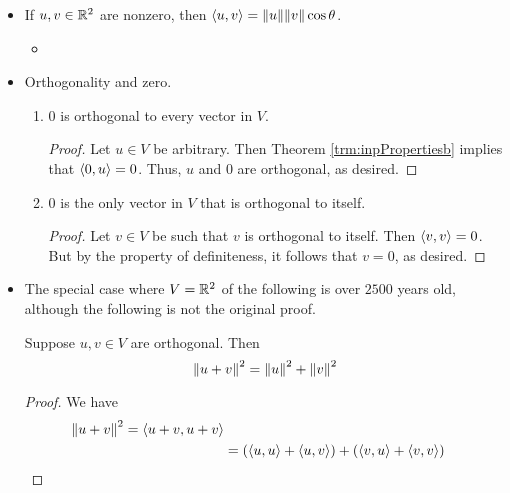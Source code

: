 \documentclass[../main.tex]{subfiles}
\begin{document}
\begin{itemize}
    \item If $u,v\in\mathbb{R}^2$ are nonzero, then $\langle{u},{v}\rangle=\norm{u}\norm{v}\cos\theta$.
    \begin{itemize}
        \item {}
    \end{itemize}
    \item Orthogonality and zero.
    \begin{theorem}\leavevmode
        \begin{enumerate}[label={\textup{(}\alph*\textup{)}}]
            \item $0$ is orthogonal to every vector in $V$.
            \begin{proof}
                Let $u\in V$ be arbitrary. Then Theorem \ref{trm:inpPropertiesb} implies that $\langle{0},{u}\rangle=0$. Thus, $u$ and 0 are orthogonal, as desired.
            \end{proof}
            \item $0$ is the only vector in $V$ that is orthogonal to itself.
            \begin{proof}
                Let $v\in V$ be such that $v$ is orthogonal to itself. Then $\langle{v},{v}\rangle=0$. But by the property of definiteness, it follows that $v=0$, as desired.
            \end{proof}
        \end{enumerate}
    \end{theorem}
    \item The special case where $V=\mathbb{R}^2$ of the following is over $\num{2500}$ years old, although the following is not the original proof.
    \begin{theorem}\label{trm:pythagorean}
        Suppose $u,v\in V$ are orthogonal. Then
        \begin{equation*}
            \norm{u+v}^2 = \norm{u}^2+\norm{v}^2
        \end{equation*}
        \begin{proof}
            We have
            \begin{align*}
                \norm{u+v}^2 = \inp{u+v}{u+v}\\
                &= (\inp{u}{u}+\inp{u}{v})+(\inp{v}{u}+\inp{v}{v})\\

\end{align*}
\end{proof}
\end{theorem}
\end{itemize}
\end{document}
